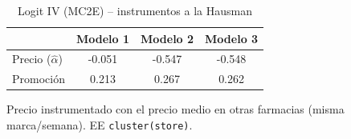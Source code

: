 \begin{table}[H]
\centering
\caption{Logit IV (MC2E) -- instrumentos a la Hausman}
\begin{tabular}{lccc}
\toprule
 & Modelo 1 & Modelo 2 & Modelo 3 \\
\midrule
Precio ($\hat{\alpha}$) & -0.051 & -0.547 & -0.548 \\
Promoci\'on & 0.213 & 0.267 & 0.262 \\
\bottomrule
\end{tabular}

\smallskip
{\footnotesize\begin{minipage}{0.92\linewidth}Precio instrumentado con el precio medio en otras farmacias (misma marca/semana). EE \texttt{cluster(store)}.\end{minipage}}
\end{table}
